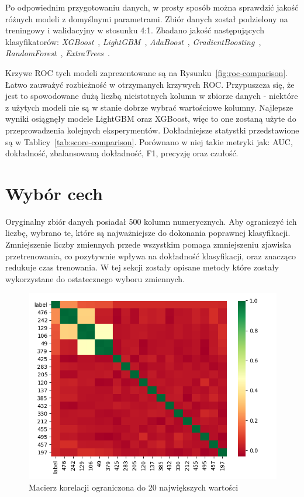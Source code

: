 \documentclass[a4paper,12pt]{article}
\begin{document}
    Po odpowiednim przygotowaniu danych, w prosty sposób można sprawdzić jakość różnych modeli z domyślnymi parametrami.
    Zbiór danych został podzielony na treningowy i walidacyjny w stosunku 4:1.
    Zbadano jakość następujących klasyfikatorów: \textit{XGBoost}~\cite{xgboost}, \textit{LightGBM}~\cite{lightgbm}, \textit{AdaBoost}~\cite{adaboost}, \textit{GradientBoosting}~\cite{gradient-boosting}, \textit{RandomForest}~\cite{random-forest}, \textit{ExtraTrees}~\cite{extra-trees}.

    Krzywe ROC tych modeli zaprezentowane są na Rysunku~\ref{fig:roc-comparison}.
    Łatwo zauważyć rozbieżność w otrzymanych krzywych ROC\@.
    Przypuszcza się, że jest to spowodowane dużą liczbą nieistotnych kolumn w zbiorze danych - niektóre z użytych modeli nie są w stanie dobrze wybrać wartościowe kolumny.
    Najlepsze wyniki osiągnęły modele LightGBM oraz XGBoost, więc to one zostaną użyte do przeprowadzenia kolejnych eksperymentów.
    Dokładniejsze statystki przedstawione są w Tablicy~\ref{tab:score-comparison}.
    Porównano w niej takie metryki jak: AUC, dokładność, zbalansowaną dokładność, F1, precyzję oraz czułość.

    \section{Wybór cech}

    Oryginalny zbiór danych posiadał 500 kolumn numerycznych.
    Aby ograniczyć ich liczbę, wybrano te, które są najważniejsze do dokonania poprawnej klasyfikacji.
    Zmniejszenie liczby zmiennych przede wszystkim pomaga zmniejszeniu zjawiska przetrenowania, co pozytywnie wpływa na dokładność klasyfikacji, oraz znacząco redukuje czas trenowania.
    W tej sekcji zostały opisane metody które zostały wykorzystane do ostatecznego wyboru zmiennych.

    \begin{figure}
        \vspace{-40pt}
        \centering
        \includegraphics[width=\linewidth]{../images/correlation-matrix.png}
        \caption{Macierz korelacji ograniczona do 20 największych wartości}
        \label{fig:correlation-matrix}
    \end{figure}
\end{document}
